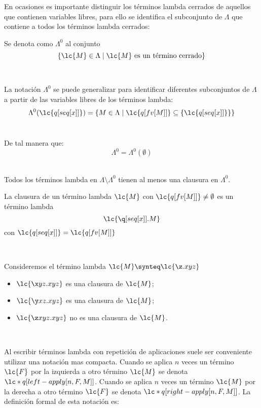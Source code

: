 En ocasiones es importante distinguir los términos lambda cerrados de aquellos
que contienen variables libres, para ello se identifica el subconjunto de
\(\Lambda\) que contiene a todos los términos lambda cerrados: \\

\begin{defi} Se denota como \(\Lambda^{0}\) al conjunto \
  \label{definicion:terminoscerrados}
  \[\{\lc{M} \in \Lambda \mid \lc{M} \text{ es un término cerrado}\}\]
\end{defi} \

La notación \(\Lambda^{0}\) se puede generalizar para identificar diferentes
subconjuntos de \(\Lambda\) a partir de las variables libres de los términos
lambda: \\

\[\Lambda^{0}(\lc{q[seq[x]]})=\{M\in\Lambda \mid \lc{q[fv[M]]}\subseteq
  \{\lc{q[seq[x]]}\}\}\] \

De tal manera que: \\

\[\Lambda^{0} = \Lambda^{0}(\emptyset)\] \

Todos los términos lambda en \(\Lambda \setminus \Lambda^{0}\) tienen al menos
una clausura en \(\Lambda^{0}\). \\

\begin{defi}[Clausura] La clausura de un término lambda \(\lc{M}\) con
  \(\lc{q[fv[M]]} \not= \emptyset\) es un término lambda
  \label{definicion:clausura}
  \[\lc{\q[seq[x]].M}\]
  con \(\lc{q[seq[x]]}=\lc{q[fv[M]]}\)
\end{defi} \

\begin{ejemplo} Consideremos el término lambda \(\lc{M} \synteq \lc{\z.x y z}\)
  \begin{itemize}
  \item \(\lc{\x y z.x y z}\) es una clausura de \(\lc{M}\);
  \item \(\lc{\y x z.x y z}\) es una clausura de \(\lc{M}\);
  \item \(\lc{\z x y z.x y z}\) no es una clausura de \(\lc{M}\).
  \end{itemize}
\end{ejemplo} \

Al escribir términos lambda con repetición de aplicaciones suele ser conveniente
utilizar una notación mas compacta. Cuando se aplica \(n\) veces un término
\(\lc{F}\) por la izquierda a otro término \(\lc{M}\) se denota
\(\lc*{q[left-apply[n,F,M]]}\). Cuando se aplica \(n\) veces un término
\(\lc{M}\) por la derecha a otro término \(\lc{F}\) se denota
\(\lc*{q[right-apply[n,F,M]]}\). La definición formal de esta notación es: \\

